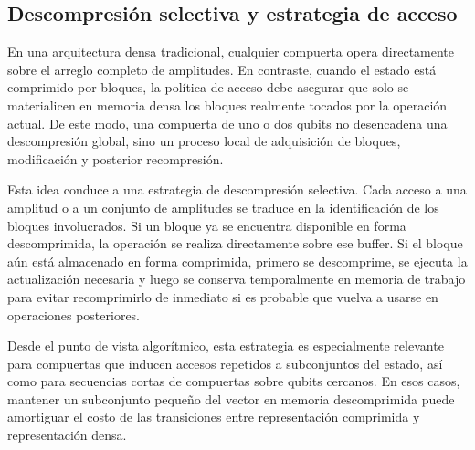 \subsection{Descompresión selectiva y estrategia de acceso}

En una arquitectura densa tradicional, cualquier compuerta opera directamente sobre el arreglo completo de amplitudes. En contraste, cuando el
estado está comprimido por bloques, la política de acceso debe asegurar que solo se materialicen en memoria densa los bloques realmente tocados por
la operación actual. De este modo, una compuerta de uno o dos qubits no desencadena una descompresión global, sino un proceso local de adquisición
de bloques, modificación y posterior recompresión.

Esta idea conduce a una estrategia de descompresión selectiva. Cada acceso a una amplitud o a un conjunto de amplitudes se traduce en la identificación
de los bloques involucrados. Si un bloque ya se encuentra disponible en forma descomprimida, la operación se realiza directamente sobre ese buffer.
Si el bloque aún está almacenado en forma comprimida, primero se descomprime, se ejecuta la actualización necesaria y luego se conserva temporalmente
en memoria de trabajo para evitar recomprimirlo de inmediato si es probable que vuelva a usarse en operaciones posteriores.

Desde el punto de vista algorítmico, esta estrategia es especialmente relevante para compuertas que inducen accesos repetidos a subconjuntos del
estado, así como para secuencias cortas de compuertas sobre qubits cercanos. En esos casos, mantener un subconjunto pequeño del vector en memoria
descomprimida puede amortiguar el costo de las transiciones entre representación comprimida y representación densa.
